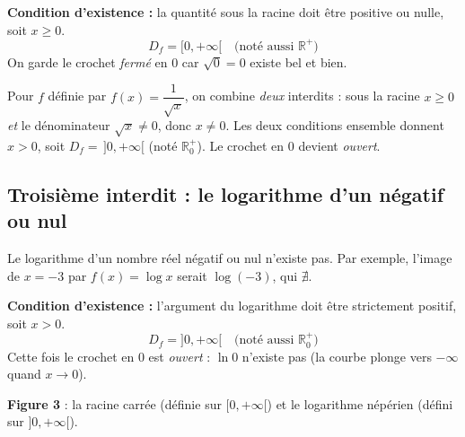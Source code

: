 \documentclass[11pt,a4paper]{article}
\newcommand{\R}{\mathbb{R}}
\newcommand{\Df}{D_f}
\begin{document}
\begin{exemple}[Fonction racine carrée $f(x)=\sqrt{x}$]
\textbf{Condition d'existence :} la quantité sous la racine doit être positive ou nulle,
soit $x\geq 0$.
\[
  \boxed{\;\Df = \big[0,+\infty\big[\quad\text{(noté aussi }\R^{+}\text{)}\;}
\]
On garde le crochet \emph{fermé} en $0$ car $\sqrt{0}=0$ existe bel et bien.
\end{exemple}

\begin{remarque}
Pour $f$ définie par $f(x)=\dfrac{1}{\sqrt{x}}$, on combine \emph{deux} interdits :
sous la racine $x\geq 0$ \emph{et} le dénominateur $\sqrt{x}\neq 0$, donc $x\neq 0$.
Les deux conditions ensemble donnent $x>0$, soit
$\Df=\,]0,+\infty[$ (noté $\R_0^{+}$). Le crochet en $0$ devient \emph{ouvert}.
\end{remarque}

\subsection{Troisième interdit : le logarithme d'un négatif ou nul}

Le logarithme d'un nombre réel négatif ou nul n'existe pas. Par exemple, l'image de
$x=-3$ par $f(x)=\log x$ serait $\log(-3)$, qui $\nexists$.

\begin{exemple}[Fonction logarithme $f(x)=\ln x$]
\textbf{Condition d'existence :} l'argument du logarithme doit être strictement positif,
soit $x>0$.
\[
  \boxed{\;\Df = \big]0,+\infty\big[\quad\text{(noté aussi }\R_0^{+}\text{)}\;}
\]
Cette fois le crochet en $0$ est \emph{ouvert} : $\ln 0$ n'existe pas (la courbe plonge
vers $-\infty$ quand $x\to 0$).
\end{exemple}

\begin{center}
\hfill
{}
\textbf{\textcolor{primary}{Figure 3}} : la racine carrée (définie sur $[0,+\infty[$) et le
logarithme népérien (défini sur $]0,+\infty[$).
\end{center}
\end{document}
